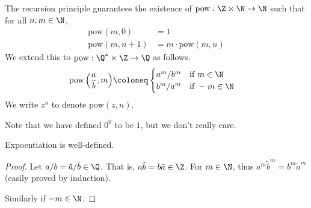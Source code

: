 \begin{definition*}[Exponentiation] \label{def:exponentiation}
    The recursion principle guarantees the existence of
    $\mathrm{pow} : \Z \times \N \to \N$ such that for all $n, m \in \N$,
    \begin{align*}
        \mathrm{pow}(m, 0) &= 1 \\
        \mathrm{pow}(m, n + 1) &= m \cdot \mathrm{pow}(m, n)
    \end{align*}
    We extend this to $\mathrm{pow} : \Q^* \times \Z \to \Q$ as follows.
    \begin{align*}
        \mathrm{pow}\left(\frac{a}{b}, m\right) &\coloneq \begin{cases}
            a^m / b^m & \text{if } m \in \N \\
            b^m / a^m & \text{if } -m \in \N \\
        \end{cases}
    \end{align*}
    We write $z^n$ to denote $\mathrm{pow}(z, n)$.
\end{definition*}
\begin{remark}
    Note that we have defined $0^0$ to be $1$, but we don't really care.
\end{remark}
\begin{proposition}
    Expoentiation is well-defined.
\end{proposition}
\begin{proof}
    Let $a/b = \tilde{a}/\tilde{b} \in \Q$.
    That is, $a\tilde{b} = b\tilde{a} \in \Z$.
    For $m \in \N$, thus $a^m \tilde{b}^m = b^m \tilde{a}^m$ (easily proved by
    induction).

    Similarly if $-m \in \N$.
\end{proof}

